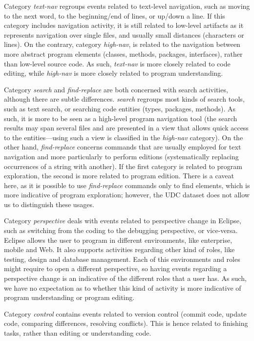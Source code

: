 \documentclass[times]{smrauth}
\newcommand\RR[1]{\textbf{Romain #1}}
\begin{document}
Category \emph{text-nav} regroups events related to text-level navigation, such as moving to the next word, to the beginning/end of lines, or up/down a line. If this category includes navigation activity, it is still related to low-level artifacts as it represents navigation over single files, and usually small distances (characters or lines). On the contrary, category \emph{high-nav}, is related to the navigation between more abstract program elements (classes, methods, packages, interfaces), rather than low-level source code. As such, \emph{text-nav} is more closely related to code editing, while \emph{high-nav} is more closely related to program understanding.

Category \emph{search} and \emph{find-replace} are both concerned with search activities, although there are subtle differences. \emph{search} regroups most kinds of search tools, such as text search, or searching code entities (types, packages, methods). As such, it is more to be seen as a high-level program navigation tool (the search results may span several files and are presented in a view that allows quick access to the entities---using such a view is classified in the \emph{high-nav} category). On the other hand, \emph{find-replace} concerns commands that are usually employed for text navigation and more particularly to perform editions (systematically replacing occurrences of a string with another). If the first category is related to program exploration, the second is more related to program edition. There is a caveat here, as it is possible to use \emph{find-replace} commands only to find elements, which is more indicative of program exploration; however, the UDC dataset does not allow us to distinguish these usages.

Category \emph{perspective} deals with events related to perspective change in Eclipse, such as switching from the coding to the debugging perspective, or vice-versa. Eclipse allows the user to program in different environments, like enterprise, mobile and Web. It also supports activities regarding other kind of roles, like testing, design and database management. Each of this environments and roles might require to open a different perspective, so having events regarding a perspective change is an indicative of the different roles that a user has.
As such, we have no expectation as to whether this kind of activity is more indicative of program understanding or program editing. %

Category \emph{control} contains events related to version control (commit code, update code, comparing differences, resolving conflicts). This is hence related to finishing tasks, rather than editing or understanding code. 
\end{document}
